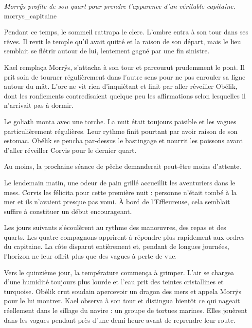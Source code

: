 {\textit{Morrÿs profite de son quart pour prendre l'apparence d'un véritable capitaine.}}
{morrys_capitaine}

Pendant ce temps, le sommeil rattrapa le clerc. L'ombre entra à son tour dans ses rêves. Il revit le temple qu'il avait quitté et la raison de son départ, mais le lieu semblait se flétrir autour de lui, lentement gagné par une fin sinistre.

Kael remplaça Morrÿs, s'attacha à son tour et parcourut prudemment le pont. Il prit soin de tourner régulièrement dans l'autre sens pour ne pas enrouler sa ligne autour du mât. L'orc ne vit rien d'inquiétant et finit par aller réveiller Obélik, dont les ronflements contredisaient quelque peu les affirmations selon lesquelles il n'arrivait pas à dormir.

Le goliath monta avec une torche. La nuit était toujours paisible et les vagues particulièrement régulières. Leur rythme finit pourtant par avoir raison de son estomac. Obélik se pencha par-dessus le bastingage et nourrit les poissons avant d'aller réveiller Corvis pour le dernier quart.

\begin{narrateur}
Au moins, la prochaine séance de pêche demanderait peut-être moins d'attente.
\end{narrateur}

\scenebreak

Le lendemain matin, une odeur de pain grillé accueillit les aventuriers dans le mess. Corvis les félicita pour cette première nuit : personne n'était tombé à la mer et ils n'avaient presque pas vomi. À bord de l'Effleureuse, cela semblait suffire à constituer un début encourageant.

Les jours suivants s'écoulèrent au rythme des manœuvres, des repas et des quarts. Les quatre compagnons apprirent à répondre plus rapidement aux ordres du capitaine. La côte disparut entièrement et, pendant de longues journées, l'horizon ne leur offrit plus que des vagues à perte de vue.

Vers le quinzième jour, la température commença à grimper. L'air se chargea d'une humidité toujours plus lourde et l'eau prit des teintes cristallines et turquoise. Obélik crut soudain apercevoir un dragon des mers et appela Morrÿs pour le lui montrer. Kael observa à son tour et distingua bientôt ce qui nageait réellement dans le sillage du navire : un groupe de tortues marines. Elles jouèrent dans les vagues pendant près d'une demi-heure avant de reprendre leur route.

